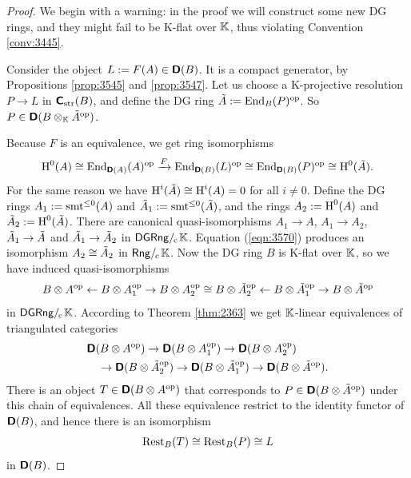 \begin{proof}
We begin with a warning: in the proof we will construct some new DG rings,
and they might fail to be K-flat over $\mathbb{K}$, thus violating Convention 
\ref{conv:3445}.

Consider the object $L := F(A) \in \boldsymbol{\mathsf{D}}(B)$.
It is a compact generator, by Propositions \ref{prop:3545} and \ref{prop:3547}.
Let us choose a K-projective resolution $P \to L$ in 
$\boldsymbol{\mathsf{C}}_{\mathrm{str}}(B)$, and define the DG ring
$\tilde{A} := \operatorname{End}_B(P)^{\mathrm{op}}$.
So $P \in \boldsymbol{\mathsf{D}}(B \otimes_{\mathbb{K}} \tilde{A}^{\mathrm{op}})$.

Because $F$ is an equivalence, we get ring isomorphisms 
\begin{equation} \label{eqn:3570}
\operatorname{H}^0(A) \cong \operatorname{End}_{\boldsymbol{\mathsf{D}}(A)}(A)^{\mathrm{op}} \xrightarrow{F} 
\operatorname{End}_{\boldsymbol{\mathsf{D}}(B)}(L)^{\mathrm{op}} \cong 
\operatorname{End}_{\boldsymbol{\mathsf{D}}(B)}(P)^{\mathrm{op}} \cong \operatorname{H}^0(\tilde{A}) .
\end{equation}
For the same reason we have 
$\operatorname{H}^i(\tilde{A}) \cong \operatorname{H}^i(A)  = 0$ for all $i \neq 0$. 
Define the DG rings $A_1 := \operatorname{smt}^{\leq 0}(A)$ and 
$\tilde{A}_1 := \operatorname{smt}^{\leq 0}(\tilde{A})$,
and the rings $A_2 := \operatorname{H}^{0}(A)$ and
$\tilde{A}_2 := \operatorname{H}^{0}(\tilde{A})$. 
There are canonical quasi-isomorphisms 
$A_1 \to A$, $A_1 \to A_2$, 
$\tilde{A}_1 \to \tilde{A}$ and $\tilde{A}_1 \to \tilde{A}_2$ 
in $\mathrm{\mathsf{DGRng}} /_{\mspace{-2mu} \mathrm{c}} \mspace{2mu} \mathbb{K}$. Equation (\ref{eqn:3570}) produces an 
isomorphism $A_2 \cong \tilde{A}_2$ in $\mathrm{\mathsf{Rng}} /_{\mspace{-2mu} \mathrm{c}} \mspace{2mu} \mathbb{K}$.
Now the DG ring $B$ is K-flat over $\mathbb{K}$, so we have induced quasi-isomorphisms
\[ B \otimes A^{\mathrm{op}} \leftarrow B \otimes A_1^{\mathrm{op}} \to B \otimes A_2^{\mathrm{op}}
\cong B \otimes \tilde{A}_2^{\mathrm{op}} \leftarrow 
B \otimes \tilde{A}_1^{\mathrm{op}} \to B \otimes \tilde{A}^{\mathrm{op}} \]
in $\mathrm{\mathsf{DGRng}} /_{\mspace{-2mu} \mathrm{c}} \mspace{2mu} \mathbb{K}$. According to Theorem \ref{thm:2363} we get 
$\mathbb{K}$-linear equivalences of  triangulated categories 
\[ \begin{aligned}
& \boldsymbol{\mathsf{D}}(B \otimes A^{\mathrm{op}}) \to \boldsymbol{\mathsf{D}}(B \otimes A_1^{\mathrm{op}}) \to 
\boldsymbol{\mathsf{D}}(B \otimes A_2^{\mathrm{op}}) 
\\
& \quad \to \boldsymbol{\mathsf{D}}(B \otimes \tilde{A}_2^{\mathrm{op}}) \to 
\boldsymbol{\mathsf{D}}(B \otimes \tilde{A}_1^{\mathrm{op}}) \to \boldsymbol{\mathsf{D}}(B \otimes \tilde{A}^{\mathrm{op}}) .
\end{aligned} \]
There is an object $T \in \boldsymbol{\mathsf{D}}(B \otimes A^{\mathrm{op}})$ that 
corresponds to $P \in \boldsymbol{\mathsf{D}}(B \otimes \tilde{A}^{\mathrm{op}})$
under this chain of equivalences. All these equivalence restrict to the 
identity functor of $\boldsymbol{\mathsf{D}}(B)$, and hence there is an isomorphism 
\begin{equation} \label{eqn:4181}
\operatorname{Rest}_B(T) \cong \operatorname{Rest}_B(P) \cong L 
\end{equation}
in $\boldsymbol{\mathsf{D}}(B)$. 


\end{proof}
